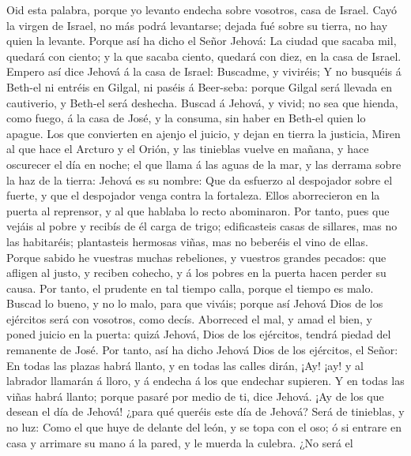  Oid esta palabra, porque yo levanto endecha sobre
vosotros, casa de Israel.  Cayó la virgen de Israel, no
más podrá levantarse; dejada fué sobre su tierra, no hay quien la
levante.  Porque así ha dicho el Señor Jehová: La ciudad
que sacaba mil, quedará con ciento; y la que sacaba ciento, quedará con
diez, en la casa de Israel.  Empero así dice Jehová á la
casa de Israel: Buscadme, y viviréis;  Y no busquéis á
Beth-el ni entréis en Gilgal, ni paséis á Beer-seba: porque Gilgal será
llevada en cautiverio, y Beth-el será deshecha.  Buscad á
Jehová, y vivid; no sea que hienda, como fuego, á la casa de José, y la
consuma, sin haber en Beth-el quien lo apague.  Los que
convierten en ajenjo el juicio, y dejan en tierra la justicia,
 Miren al que hace el Arcturo y el Orión, y las tinieblas
vuelve en mañana, y hace oscurecer el día en noche; el que llama á las
aguas de la mar, y las derrama sobre la haz de la tierra: Jehová es su
nombre:  Que da esfuerzo al despojador sobre el fuerte, y
que el despojador venga contra la fortaleza.  Ellos
aborrecieron en la puerta al reprensor, y al que hablaba lo recto
abominaron.  Por tanto, pues que vejáis al pobre y
recibís de él carga de trigo; edificasteis casas de sillares, mas no las
habitaréis; plantasteis hermosas viñas, mas no beberéis el vino de
ellas.  Porque sabido he vuestras muchas rebeliones, y
vuestros grandes pecados: que afligen al justo, y reciben cohecho, y á
los pobres en la puerta hacen perder su causa.  Por
tanto, el prudente en tal tiempo calla, porque el tiempo es malo.
 Buscad lo bueno, y no lo malo, para que viváis; porque
así Jehová Dios de los ejércitos será con vosotros, como decís.
 Aborreced el mal, y amad el bien, y poned juicio en la
puerta: quizá Jehová, Dios de los ejércitos, tendrá piedad del remanente
de José.  Por tanto, así ha dicho Jehová Dios de los
ejércitos, el Señor: En todas las plazas habrá llanto, y en todas las
calles dirán, ¡Ay! ¡ay! y al labrador llamarán á lloro, y á endecha á
los que endechar supieren.  Y en todas las viñas habrá
llanto; porque pasaré por medio de ti, dice Jehová.  ¡Ay
de los que desean el día de Jehová! ¿para qué queréis este día de
Jehová? Será de tinieblas, y no luz:  Como el que huye de
delante del león, y se topa con el oso; ó si entrare en casa y arrimare
su mano á la pared, y le muerda la culebra.  ¿No será el
